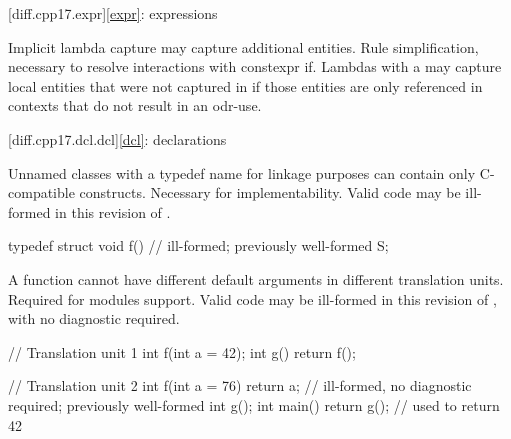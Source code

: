 [diff.cpp17.expr]{\ref{expr}: expressions}

\change
Implicit lambda capture may capture additional entities.
\rationale
Rule simplification, necessary to resolve interactions with constexpr if.
\effect
Lambdas with a 
may capture local entities
that were not captured in \CppXVII{}
if those entities are only referenced in contexts
that do not result in an odr-use.

[diff.cpp17.dcl.dcl]{\ref{dcl}: declarations}

\change
Unnamed classes with a typedef name for linkage purposes
can contain only C-compatible constructs.
\rationale
Necessary for implementability.
\effect
Valid \CppXVII{} code may be ill-formed in this revision of \Cpp{}.
\begin{example}
\begin{codeblock}
typedef struct {
  void f() {}           // ill-formed; previously well-formed
} S;
\end{codeblock}
\end{example}

\change
A function cannot have different default arguments
in different translation units.
\rationale
Required for modules support.
\effect
Valid \CppXVII{} code may be ill-formed in this revision of \Cpp{},
with no diagnostic required.
\begin{example}
\begin{codeblock}
// Translation unit 1
int f(int a = 42);
int g() { return f(); }

// Translation unit 2
int f(int a = 76) { return a; }         // ill-formed, no diagnostic required; previously well-formed
int g();
int main() { return g(); }              // used to return 42
\end{codeblock}
\end{example}

